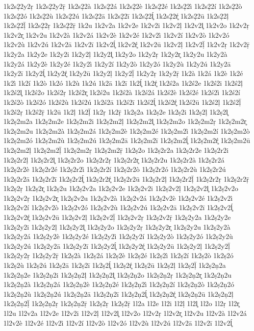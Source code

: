 {1k2s2̣2y2ṛ
1k2s2̣2y2ṝ
1k2s2̣2à
1k2s2̣2á
1k2s2̣2è
1k2s2̣2é
1k2s2̣2ì
1k2s2̣2í
1k2s2̣2ò
1k2s2̣2ó
1k2s2̣2ù
1k2s2̣2ú
1k2s2̣2ā
1k2s2̣2ī
1k2s2̣2ĺ̥
1k2s2̣2ŕ̥
1k2s2̣2ū
1k2s2̣2ḷ
1k2s2̣2ḹ
1k2s2̣2ṛ
1k2s2̣2ṝ
1k2u
1k2v2a
1k2v2e
1k2v2i
1k2v2ḷ
1k2v2l̥
1k2v2o
1k2v2ṛ
1k2v2r̥
1k2v2u
1k2v2à
1k2v2á
1k2v2è
1k2v2é
1k2v2ì
1k2v2í
1k2v2ò
1k2v2ó
1k2v2ù
1k2v2ú
1k2v2ā
1k2v2ī
1k2v2ĺ̥
1k2v2ŕ̥
1k2v2ū
1k2v2ḷ
1k2v2ḹ
1k2v2ṛ
1k2v2ṝ
1k2y2a
1k2y2e
1k2y2i
1k2y2ḷ
1k2y2l̥
1k2y2o
1k2y2ṛ
1k2y2r̥
1k2y2u
1k2y2à
1k2y2á
1k2y2è
1k2y2é
1k2y2ì
1k2y2í
1k2y2ò
1k2y2ó
1k2y2ù
1k2y2ú
1k2y2ā
1k2y2ī
1k2y2ĺ̥
1k2y2ŕ̥
1k2y2ū
1k2y2ḷ
1k2y2ḹ
1k2y2ṛ
1k2y2ṝ
1k2à
1k2á
1k2è
1k2é
1k2ì
1k2í
1k2ò
1k2ó
1k2ù
1k2ú
1k2ā
1k2ī
1k2ĺ̥
1k2ŕ̥
1k2ś2a
1k2ś2e
1k2ś2i
1k2ś2ḷ
1k2ś2l̥
1k2ś2o
1k2ś2ṛ
1k2ś2r̥
1k2ś2u
1k2ś2à
1k2ś2á
1k2ś2è
1k2ś2é
1k2ś2ì
1k2ś2í
1k2ś2ò
1k2ś2ó
1k2ś2ù
1k2ś2ú
1k2ś2ā
1k2ś2ī
1k2ś2ĺ̥
1k2ś2ŕ̥
1k2ś2ū
1k2ś2ḷ
1k2ś2ḹ
1k2ś2ṛ
1k2ś2ṝ
1k2ū
1k2ḷ
1k2ḹ
1k2ṛ
1k2ṝ
1k2ṣ2a
1k2ṣ2e
1k2ṣ2i
1k2ṣ2ḷ
1k2ṣ2l̥
1k2ṣ2m2a
1k2ṣ2m2e
1k2ṣ2m2i
1k2ṣ2m2ḷ
1k2ṣ2m2l̥
1k2ṣ2m2o
1k2ṣ2m2ṛ
1k2ṣ2m2r̥
1k2ṣ2m2u
1k2ṣ2m2à
1k2ṣ2m2á
1k2ṣ2m2è
1k2ṣ2m2é
1k2ṣ2m2ì
1k2ṣ2m2í
1k2ṣ2m2ò
1k2ṣ2m2ó
1k2ṣ2m2ù
1k2ṣ2m2ú
1k2ṣ2m2ā
1k2ṣ2m2ī
1k2ṣ2m2ĺ̥
1k2ṣ2m2ŕ̥
1k2ṣ2m2ū
1k2ṣ2m2ḷ
1k2ṣ2m2ḹ
1k2ṣ2m2ṛ
1k2ṣ2m2ṝ
1k2ṣ2o
1k2ṣ2r2a
1k2ṣ2r2e
1k2ṣ2r2i
1k2ṣ2r2ḷ
1k2ṣ2r2l̥
1k2ṣ2r2o
1k2ṣ2r2ṛ
1k2ṣ2r2r̥
1k2ṣ2r2u
1k2ṣ2r2à
1k2ṣ2r2á
1k2ṣ2r2è
1k2ṣ2r2é
1k2ṣ2r2ì
1k2ṣ2r2í
1k2ṣ2r2ò
1k2ṣ2r2ó
1k2ṣ2r2ù
1k2ṣ2r2ú
1k2ṣ2r2ā
1k2ṣ2r2ī
1k2ṣ2r2ĺ̥
1k2ṣ2r2ŕ̥
1k2ṣ2r2ū
1k2ṣ2r2ḷ
1k2ṣ2r2ḹ
1k2ṣ2r2ṛ
1k2ṣ2r2ṝ
1k2ṣ2ṛ
1k2ṣ2r̥
1k2ṣ2u
1k2ṣ2v2a
1k2ṣ2v2e
1k2ṣ2v2i
1k2ṣ2v2ḷ
1k2ṣ2v2l̥
1k2ṣ2v2o
1k2ṣ2v2ṛ
1k2ṣ2v2r̥
1k2ṣ2v2u
1k2ṣ2v2à
1k2ṣ2v2á
1k2ṣ2v2è
1k2ṣ2v2é
1k2ṣ2v2ì
1k2ṣ2v2í
1k2ṣ2v2ò
1k2ṣ2v2ó
1k2ṣ2v2ù
1k2ṣ2v2ú
1k2ṣ2v2ā
1k2ṣ2v2ī
1k2ṣ2v2ĺ̥
1k2ṣ2v2ŕ̥
1k2ṣ2v2ū
1k2ṣ2v2ḷ
1k2ṣ2v2ḹ
1k2ṣ2v2ṛ
1k2ṣ2v2ṝ
1k2ṣ2y2a
1k2ṣ2y2e
1k2ṣ2y2i
1k2ṣ2y2ḷ
1k2ṣ2y2l̥
1k2ṣ2y2o
1k2ṣ2y2ṛ
1k2ṣ2y2r̥
1k2ṣ2y2u
1k2ṣ2y2à
1k2ṣ2y2á
1k2ṣ2y2è
1k2ṣ2y2é
1k2ṣ2y2ì
1k2ṣ2y2í
1k2ṣ2y2ò
1k2ṣ2y2ó
1k2ṣ2y2ù
1k2ṣ2y2ú
1k2ṣ2y2ā
1k2ṣ2y2ī
1k2ṣ2y2ĺ̥
1k2ṣ2y2ŕ̥
1k2ṣ2y2ū
1k2ṣ2y2ḷ
1k2ṣ2y2ḹ
1k2ṣ2y2ṛ
1k2ṣ2y2ṝ
1k2ṣ2à
1k2ṣ2á
1k2ṣ2è
1k2ṣ2é
1k2ṣ2ì
1k2ṣ2í
1k2ṣ2ò
1k2ṣ2ó
1k2ṣ2ù
1k2ṣ2ú
1k2ṣ2ā
1k2ṣ2ī
1k2ṣ2ĺ̥
1k2ṣ2ŕ̥
1k2ṣ2ū
1k2ṣ2ḷ
1k2ṣ2ḹ
1k2ṣ2ṇ2a
1k2ṣ2ṇ2e
1k2ṣ2ṇ2i
1k2ṣ2ṇ2ḷ
1k2ṣ2ṇ2l̥
1k2ṣ2ṇ2o
1k2ṣ2ṇ2ṛ
1k2ṣ2ṇ2r̥
1k2ṣ2ṇ2u
1k2ṣ2ṇ2à
1k2ṣ2ṇ2á
1k2ṣ2ṇ2è
1k2ṣ2ṇ2é
1k2ṣ2ṇ2ì
1k2ṣ2ṇ2í
1k2ṣ2ṇ2ò
1k2ṣ2ṇ2ó
1k2ṣ2ṇ2ù
1k2ṣ2ṇ2ú
1k2ṣ2ṇ2ā
1k2ṣ2ṇ2ī
1k2ṣ2ṇ2ĺ̥
1k2ṣ2ṇ2ŕ̥
1k2ṣ2ṇ2ū
1k2ṣ2ṇ2ḷ
1k2ṣ2ṇ2ḹ
1k2ṣ2ṇ2ṛ
1k2ṣ2ṇ2ṝ
1k2ṣ2ṛ
1k2ṣ2ṝ
1l2a
1l2e
1l2i
1l2ḷ
1l2l̥
1l2o
1l2ṛ
1l2r̥
1l2u
1l2v2a
1l2v2e
1l2v2i
1l2v2ḷ
1l2v2l̥
1l2v2o
1l2v2ṛ
1l2v2r̥
1l2v2u
1l2v2à
1l2v2á
1l2v2è
1l2v2é
1l2v2ì
1l2v2í
1l2v2ò
1l2v2ó
1l2v2ù
1l2v2ú
1l2v2ā
1l2v2ī
1l2v2ĺ̥
}
